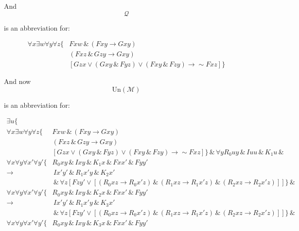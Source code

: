 \documentclass{article}
\begin{document}
And
\[
  \mathcal{Q}
\]

is an abbreviation for:

\begin{align*}
  \forall x \exists w \forall y \forall z \{
    & Fxw \,\&\, \left( Fxy \rightarrow Gxy \right) \\
    & \left( Fxz \,\&\, Gzy \rightarrow Gxy \right) \\
    & \left[
      Gzx \vee \left(Gxy \,\&\, Fyz \right) \vee \left(Fxy \,\&\, Fzy \right) \rightarrow \sim Fxz
    \right]
  \}
\end{align*}

And now 
\[
  \textrm{Un}(\mathcal{M})
\]

is an abbreviation for:

\begin{align*}
  \exists u \{\\
  \forall x \exists w \forall y \forall z \{
    & Fxw \,\&\, \left( Fxy \rightarrow Gxy \right) \\
    & \left( Fxz \,\&\, Gzy \rightarrow Gxy \right) \\
    & \left[
      Gzx \vee \left(Gxy \,\&\, Fyz \right) \vee \left(Fxy \,\&\, Fzy \right) \rightarrow \sim Fxz
    \right]\} \,\&\, \forall y  R_0 uy \,\&\, Iuu \,\&\, K_1u \,\&\, \\
    \forall x \forall y \forall x' \forall y' \{
    & R_0xy \,\&\, Ixy  \,\&\, K_1 x  \,\&\,  Fxx'  \,\&\,  Fyy' \\
    \rightarrow &\, Ix'y' \,\&\,  R_1x'y \,\&\, K_2x' \\
    & \,\&\, \forall z \left[ Fzy' \vee
      \left[
        \left( R_0xz \rightarrow R_0x'z \right) \,\&\, 
        \left( R_1xz \rightarrow R_1x'z \right) \,\&\, 
        \left( R_2xz \rightarrow R_2x'z \right)
      \right]
    \right]
  \} \,\&\, \\
  \forall x \forall y \forall x' \forall y' \{
    & R_0xy \,\&\, Ixy  \,\&\, K_2 x  \,\&\,  Fxx'  \,\&\,  Fyy' \\
    \rightarrow &\, Ix'y' \,\&\,  R_1x'y \,\&\, K_3x' \\
    & \,\&\, \forall z \left[ Fzy' \vee
      \left[
        \left( R_0xz \rightarrow R_0x'z \right) \,\&\, 
        \left( R_1xz \rightarrow R_1x'z \right) \,\&\, 
        \left( R_2xz \rightarrow R_2x'z \right)
      \right]
    \right]
  \} \,\&\, \\
  \forall x \forall y \forall x' \forall y' \{
    & R_0xy \,\&\, Ixy  \,\&\, K_3 x  \,\&\,  Fxx'  \,\&\,  Fyy' \\

\end{align*}
\end{document}
